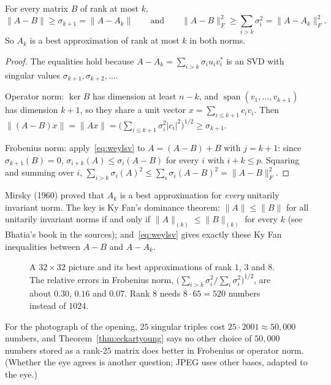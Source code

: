 \begin{theorem}\label{thm:eckartyoung}
For every matrix $B$ of rank at most $k$,
\[
\|A-B\|\ge\sigma_{k+1}=\|A-A_k\|\qquad\text{and}\qquad\|A-B\|_F^2\ge\sum_{i>k}\sigma_i^2=\|A-A_k\|_F^2.
\]
So $A_k$ is a best approximation of rank at most $k$ in both norms.
\end{theorem}
\begin{proof}
The equalities hold because $A-A_k=\sum_{i>k}\sigma_iu_iv_i^*$ is an SVD with singular values $\sigma_{k+1},\sigma_{k+2},\dots$.

Operator norm: $\ker B$ has dimension at least $n-k$, and $\operatorname{span}(v_1,\dots,v_{k+1})$ has dimension $k+1$, so they
share a unit vector $x=\sum_{i\le k+1}c_iv_i$. Then $\|(A-B)x\|=\|Ax\|=\bigl(\sum_{i\le k+1}\sigma_i^2|c_i|^2\bigr)^{1/2}\ge
\sigma_{k+1}$.

Frobenius norm: apply~\eqref{eq:weylsv} to $A=(A-B)+B$ with $j=k+1$: since $\sigma_{k+1}(B)=0$,
$\sigma_{i+k}(A)\le\sigma_i(A-B)$ for every $i$ with $i+k\le p$. Squaring and summing over $i$,
$\sum_{i>k}\sigma_i(A)^2\le\sum_i\sigma_i(A-B)^2=\|A-B\|_F^2$.
\end{proof}

\begin{remark}
Mirsky (1960) proved that $A_k$ is a best approximation for \emph{every} unitarily invariant norm. The key is Ky Fan's
dominance theorem: $\|A\|\le\|B\|$ for all unitarily invariant norms if and only if $\|A\|_{(k)}\le\|B\|_{(k)}$ for every $k$
(see Bhatia's book in the sources); and~\eqref{eq:weylsv} gives exactly these Ky Fan inequalities between $A-B$ and
$A-A_k$.
\end{remark}

\begin{figure}[ht]
\centering
{}
\caption{A $32\times32$ picture and its best approximations of rank $1$, $3$ and $8$. The relative errors in Frobenius norm,
$\bigl(\sum_{i>k}\sigma_i^2/\sum_i\sigma_i^2\bigr)^{1/2}$, are about $0.30$, $0.16$ and $0.07$. Rank $8$ needs $8\cdot65=520$
numbers instead of $1024$.}
\label{fig:lowrank}
\end{figure}

For the photograph of the opening, $25$ singular triples cost $25\cdot2001\approx50{,}000$ numbers, and
Theorem~\ref{thm:eckartyoung} says no other choice of $50{,}000$ numbers stored as a rank-$25$ matrix does better in
Frobenius or operator norm. (Whether the eye agrees is another question; JPEG uses other bases, adapted to the eye.)

